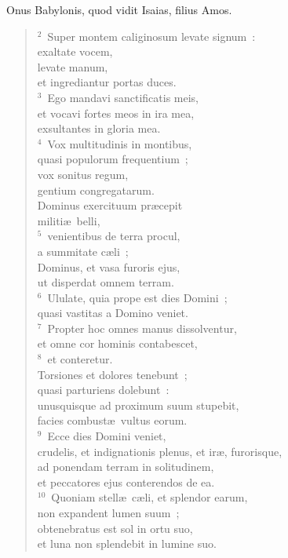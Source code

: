 \lettrine[lines=3,image=true,loversize=0.05,lraise=-0.03]{O}{}nus Babylonis, quod vidit Isaias, filius Amos.
\begin{flushleft}\begin{verse}\vspace{6pt}${}^{2}$~Super montem caliginosum levate signum~:\\ exaltate vocem,\\ levate manum,\\ et ingrediantur portas duces.\\
${}^{3}$~Ego mandavi sanctificatis meis,\\ et vocavi fortes meos in ira mea,\\ exsultantes in gloria mea.\\
${}^{4}$~Vox multitudinis in montibus,\\ quasi populorum frequentium~;\\ vox sonitus regum,\\ gentium congregatarum.\\ Dominus exercituum pr\ae cepit\\ militi\ae\ belli,\\
${}^{5}$~venientibus de terra procul,\\ a summitate c\ae li~;\\ Dominus, et vasa furoris ejus,\\ ut disperdat omnem terram.\\
${}^{6}$~Ululate, quia prope est dies Domini~;\\ quasi vastitas a Domino veniet.\\
${}^{7}$~Propter hoc omnes manus dissolventur,\\ et omne cor hominis contabescet,\\
${}^{8}$~et conteretur.\\ Torsiones et dolores tenebunt~;\\ quasi parturiens dolebunt~:\\ unusquisque ad proximum suum stupebit,\\ facies combust\ae\ vultus eorum.\\
${}^{9}$~Ecce dies Domini veniet,\\ crudelis, et indignationis plenus, et ir\ae , furorisque,\\ ad ponendam terram in solitudinem,\\ et peccatores ejus conterendos de ea.\\
${}^{10}$~Quoniam stell\ae\ c\ae li, et splendor earum,\\ non expandent lumen suum~;\\ obtenebratus est sol in ortu suo,\\ et luna non splendebit in lumine suo.\\

\end{verse}
\end{flushleft}
